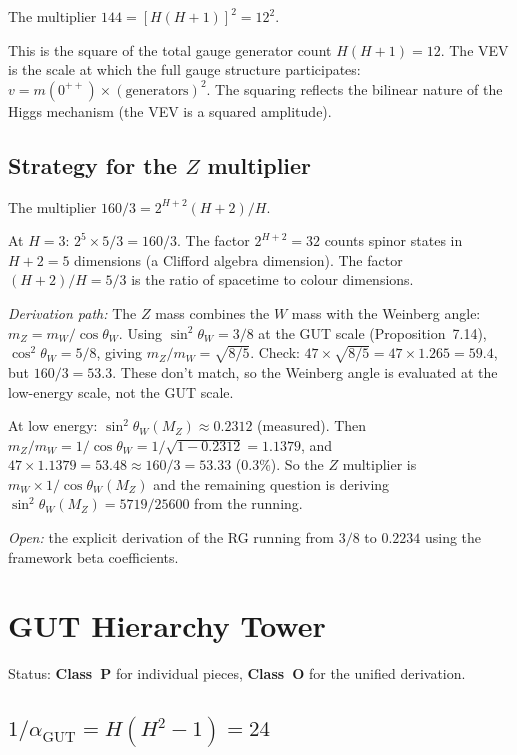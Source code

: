 \documentclass[11pt,a4paper]{article}
\theoremstyle{definition}
\theoremstyle{remark}
\begin{document}
The multiplier $144 = [H(H+1)]^2 = 12^2$.

This is the square of the total gauge generator count $H(H+1) = 12$. The VEV is the scale at which the full gauge structure participates: $v = m(0^{++}) \times (\text{generators})^2$. The squaring reflects the bilinear nature of the Higgs mechanism (the VEV is a squared amplitude).

\subsection{Strategy for the $Z$ multiplier}\label{sec:Z_strategy}

The multiplier $160/3 = 2^{H+2}(H+2)/H$.

At $H = 3$: $2^5 \times 5/3 = 160/3$. The factor $2^{H+2} = 32$ counts spinor states in $H+2 = 5$ dimensions (a Clifford algebra dimension). The factor $(H+2)/H = 5/3$ is the ratio of spacetime to colour dimensions.

\emph{Derivation path:} The $Z$ mass combines the $W$ mass with the Weinberg angle: $m_Z = m_W/\cos\theta_W$. Using $\sin^2\theta_W = 3/8$ at the GUT scale (Proposition~7.14), $\cos^2\theta_W = 5/8$, giving $m_Z/m_W = \sqrt{8/5}$. Check: $47 \times \sqrt{8/5} = 47 \times 1.265 = 59.4$, but $160/3 = 53.3$. These don't match, so the Weinberg angle is evaluated at the low-energy scale, not the GUT scale.

At low energy: $\sin^2\theta_W(M_Z) \approx 0.2312$ (measured). Then $m_Z/m_W = 1/\cos\theta_W = 1/\sqrt{1-0.2312} = 1.1379$, and $47 \times 1.1379 = 53.48 \approx 160/3 = 53.33$ ($0.3\%$). So the $Z$ multiplier is $m_W \times 1/\cos\theta_W(M_Z)$ and the remaining question is deriving $\sin^2\theta_W(M_Z) = 5719/25600$ from the running.

\emph{Open:} the explicit derivation of the RG running from $3/8$ to $0.2234$ using the framework beta coefficients.


\section{GUT Hierarchy Tower}\label{sec:gut}

Status: \textbf{Class~P} for individual pieces, \textbf{Class~O} for the unified derivation.

\subsection{$1/\alpha_{\mathrm{GUT}} = H(H^2-1) = 24$}\label{sec:alpha_gut}
\end{document}
